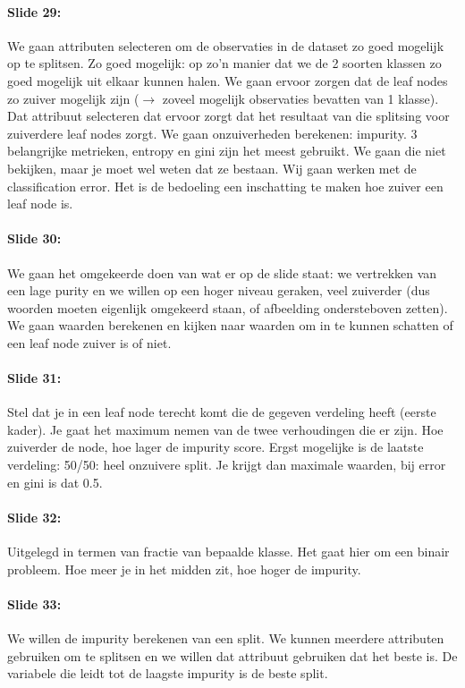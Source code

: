 \documentclass[10pt,a4paper]{report}
\begin{document}
\paragraph{Slide 29:}We gaan attributen selecteren om de observaties in de dataset zo goed mogelijk op te splitsen. Zo goed mogelijk: op zo'n manier dat we de 2 soorten klassen zo goed mogelijk uit elkaar kunnen halen. We gaan ervoor zorgen dat de leaf nodes zo zuiver mogelijk zijn ($\rightarrow$ zoveel mogelijk observaties bevatten van 1 klasse). Dat attribuut selecteren dat ervoor zorgt dat het resultaat van die splitsing voor zuiverdere leaf nodes zorgt.
We gaan onzuiverheden berekenen: impurity.
3 belangrijke metrieken, entropy en gini zijn het meest gebruikt. We gaan die niet bekijken, maar je moet wel weten dat ze bestaan. Wij gaan werken met de classification error. Het is de bedoeling een inschatting te maken hoe zuiver een leaf node is.

\paragraph{Slide 30:}We gaan het omgekeerde doen van wat er op de slide staat: we vertrekken van een lage purity en we willen op een hoger niveau geraken, veel zuiverder (dus woorden moeten eigenlijk omgekeerd staan, of afbeelding ondersteboven zetten). We gaan waarden berekenen en kijken naar waarden om in te kunnen schatten of een leaf node zuiver is of niet.

\paragraph{Slide 31:}Stel dat je in een leaf node terecht komt die de gegeven verdeling heeft (eerste kader). Je gaat het maximum nemen van de twee verhoudingen die er zijn. Hoe zuiverder de node, hoe lager de impurity score.
Ergst mogelijke is de laatste verdeling: 50/50: heel onzuivere split. Je krijgt dan maximale waarden, bij error en gini is dat 0.5.

\paragraph{Slide 32:}Uitgelegd in termen van fractie van bepaalde klasse. Het gaat hier om een binair probleem. Hoe meer je in het midden zit, hoe hoger de impurity.

\paragraph{Slide 33:}We willen de impurity berekenen van een split. We kunnen meerdere attributen gebruiken om te splitsen en we willen dat attribuut gebruiken dat het beste is. De variabele die leidt tot de laagste impurity is de beste split. 
\end{document}
